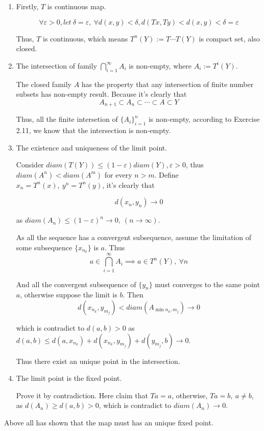 \documentclass{article}
\begin{document}
\begin{enumerate}
    \item Firstly, \(T\) is continuous map.
    
    \[\forall \varepsilon > 0, let\ \delta = \varepsilon,\ \forall d(x, y) < \delta, d(Tx, Ty) < d(x, y) < \delta = \varepsilon\]

    Thus, \(T\) is continuous, which means \(T^n(Y) := T\cdots T (Y)\) is compact set, also closed.

    \item The intersection of family \(\bigcap_{i = 1}^\infty A_i\) is non-empty, where \(A_i := T^i(Y)\).
    
    The closed family \(A\) has the property that any intersection of finite number subsets has non-empty result. Because it's clearly that
    \[A_{n + 1} \subset A_{n} \subset \cdots \subset A \subset Y\]
    
    Thus, all the finite intersetion of \(\{A_i\}_{i = 1}^n\) is non-empty, according to Exercise 2.11, we know that the intersection is non-empty.
    
    \item The existence and uniqueness of the limit point.
    
    Consider \(diam(T(Y)) \le (1 - \varepsilon) diam(Y), \varepsilon > 0\), thus \(diam(A^{n}) < diam(A^{m})\) for every \(n > m\). Define \(x_n = T^n(x),\ y^n = T^n(y)\), it's clearly that

    \[d(x_n, y_n) \to 0\]
    
    as \(diam(A_n) \le {(1 - \varepsilon)}^n  \to 0,\ (n \to \infty)\).

    As all the sequence has a convergent subsequence, assume the limitation of some subsequence \(\{x_{n_k}\}\) is \(a\). Thus
    \[a \in \bigcap_{i = 1}^\infty A_i \implies a \in T^n(Y),\ \forall n\]

    And all the convergent subsequence of \(\{y_n\}\) must converges to the same point \(a\), otherwise suppose the limit is \(b\). Then
    \[d(x_{n_k}, y_{m_j}) < diam(A_{\min n_k, m_j}) \to 0\]

    which is contradict to \(d(a, b) > 0\) as \(d(a, b) \le d(a, x_{n_k}) + d(x_{n_k}, y_{m_j}) + d(y_{m_j}, b) \to 0\).

    Thus there exist an unique point in the intersection.

    \item The limit point is the fixed point. 
    
    Prove it by contradiction. Here claim that \(Ta = a\), otherwise, \(Ta = b,\ a \ne b\), as \(d(A_n) \ge d(a, b) > 0\), which is contradict to \(diam(A_n) \to 0\).
\end{enumerate}
Above all has shown that the map must has an unique fixed point.
\end{document}
